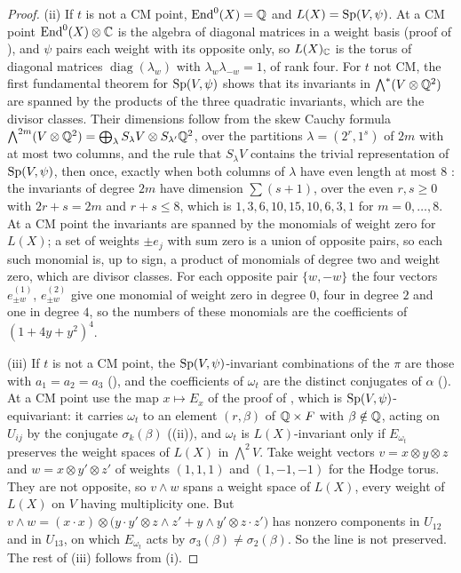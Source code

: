 \begin{proof}
(ii) If $t$ is not a CM point, $\operatorname{End}^{0}(X)=\mathbb{Q}$ and $L(X)=\operatorname{Sp}(V,\psi)$. At a
CM point $\operatorname{End}^{0}(X)\otimes\mathbb{C}$ is the algebra of diagonal matrices in a
weight basis (proof of ), and $\psi$ pairs each weight
with its opposite only, so $L(X)_{\mathbb{C}}$ is the torus of diagonal matrices
$\operatorname{diag}(\lambda_{w})$ with $\lambda_{w}\lambda_{-w}=1$, of rank
four. For $t$ not CM, the first fundamental theorem for $\operatorname{Sp}(V,\psi)$
\cite[Chapter~5]{GW09} shows that its invariants in
${\textstyle\bigwedge^{*}}(V\otimes\mathbb{Q}^{2})$ are spanned by the products of
the three quadratic invariants, which are the divisor classes. Their
dimensions follow from the skew Cauchy formula
${\textstyle\bigwedge^{2m}}(V\otimes\mathbb{Q}^{2})=\bigoplus_{\lambda}S_{\lambda}V
\otimes S_{\lambda'}\mathbb{Q}^{2}$, over the partitions $\lambda=(2^{r},1^{s})$ of
$2m$ with at most two columns, and the rule that $S_{\lambda}V$ contains the
trivial representation of $\operatorname{Sp}(V,\psi)$, then once, exactly when both columns
of $\lambda$ have even length at most $8$ \cite{GW09}: the invariants of
degree $2m$ have dimension $\sum(s+1)$, over the even $r,s\ge0$ with
$2r+s=2m$ and $r+s\le8$, which is $1,3,6,10,15,10,6,3,1$ for
$m=0,\dots,8$. At a CM point the invariants are spanned by the
monomials of weight zero for $L(X)$; a set of weights $\pm e_{j}$ with sum
zero is a union of opposite pairs, so each such monomial is, up to sign, a
product of monomials of degree two and weight zero, which are divisor
classes. For each opposite pair $\{w,-w\}$ the four vectors
$e^{(1)}_{\pm w}$, $e^{(2)}_{\pm w}$ give one monomial of weight zero in
degree $0$, four in degree $2$ and one in degree $4$, so the numbers of these
monomials are the coefficients of $(1+4y+y^{2})^{4}$.

(iii) If $t$ is not a CM point, the $\operatorname{Sp}(V,\psi)$-invariant combinations of the
$\pi$ are those with $a_{1}=a_{2}=a_{3}$ (), and
the coefficients of $\omega_{t}$ are the distinct conjugates of $\alpha$
(). At a CM point use the map $x\mapsto E_{x}$ of the
proof of , which is $\operatorname{Sp}(V,\psi)$-equivariant: it
carries $\omega_{t}$ to an element $(r,\beta)$ of $\mathbb{Q}\times F$ with
$\beta\notin\mathbb{Q}$, acting on $U_{ij}$ by the conjugate $\sigma_{k}(\beta)$
((ii)), and $\omega_{t}$ is $L(X)$-invariant only if
$E_{\omega_{t}}$ preserves the weight spaces of $L(X)$ in ${\textstyle\bigwedge^{2}}V$. Take
weight vectors $v=x\otimes y\otimes z$ and $w=x\otimes y'\otimes z'$ of
weights $(1,1,1)$ and $(1,-1,-1)$ for the Hodge torus. They are not
opposite, so $v\wedge w$ spans a weight space of $L(X)$, every weight of
$L(X)$ on $V$ having multiplicity one. But
$v\wedge w=(x\cdot x)\otimes\bigl(y\cdot y'\otimes z\wedge z'+y\wedge y'
\otimes z\cdot z'\bigr)$ has nonzero components in $U_{12}$ and in $U_{13}$,
on which $E_{\omega_{t}}$ acts by $\sigma_{3}(\beta)\ne\sigma_{2}(\beta)$. So
the line is not preserved. The rest of (iii) follows from (i).


\end{proof}

